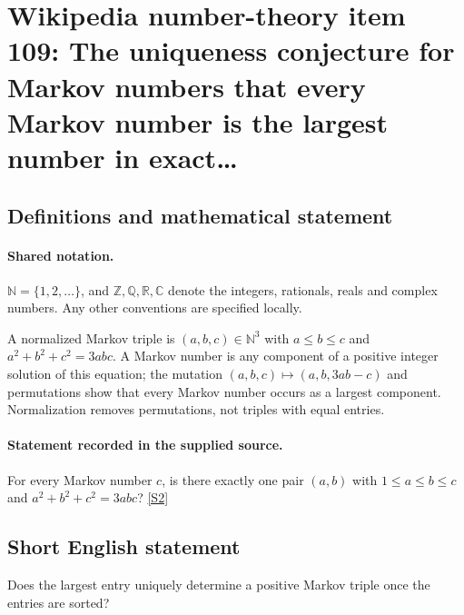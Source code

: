 \documentclass[11pt]{article}
\newcommand{\sref}[2]{\hyperlink{source:#1:#2}{[S#2]}}
\begin{document}
\section{Wikipedia number-theory item 109: The uniqueness conjecture for Markov numbers that every Markov number is the largest number in exact…}\label{statement}

\subsection{Definitions and mathematical statement}

\paragraph{Shared notation.}$\mathbb N=\{1,2,\ldots\}$, and $\mathbb Z,\mathbb Q,\mathbb R,\mathbb C$ denote the integers, rationals, reals and complex numbers. Any other conventions are specified locally.


A normalized Markov triple is $(a,b,c)\in\mathbb N^3$ with $a\le b\le c$ and $a^2+b^2+c^2=3abc$. A Markov number is any component of a positive integer solution of this equation; the mutation $(a,b,c)\mapsto(a,b,3ab-c)$ and permutations show that every Markov number occurs as a largest component. Normalization removes permutations, not triples with equal entries.
\paragraph{Statement recorded in the supplied source.}
For every Markov number $c$, is there exactly one pair $(a,b)$ with $1\le a\le b\le c$ and $a^2+b^2+c^2=3abc$? \sref{statement}{2}
\subsection{Short English statement}
Does the largest entry uniquely determine a positive Markov triple once the entries are sorted?
\end{document}
